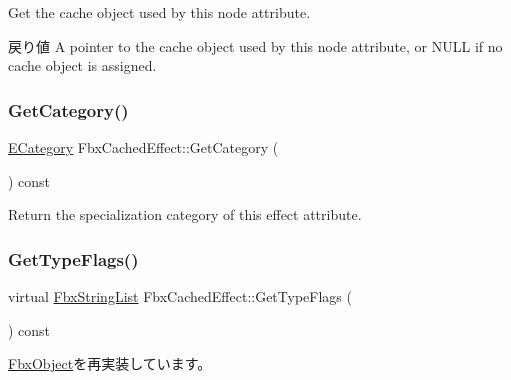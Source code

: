 Get the cache object used by this node attribute. \begin{DoxyReturn}{戻り値}
A pointer to the cache object used by this node attribute, or {\ttfamily N\+U\+LL} if no cache object is assigned. 
\end{DoxyReturn}
\mbox{\label{class_fbx_cached_effect_af5282be789653d1a9c189ddd8540bc5b}} 
\subsubsection{\texorpdfstring{Get\+Category()}{GetCategory()}}
{\footnotesize\ttfamily \hyperlink{class_fbx_cached_effect_ab402402f3e66d6e31eb3002b0bd58c33}{E\+Category} Fbx\+Cached\+Effect\+::\+Get\+Category (\begin{DoxyParamCaption}{ }\end{DoxyParamCaption}) const}



Return the specialization category of this effect attribute. 

\mbox{\label{class_fbx_cached_effect_a0702b43325ac99858e85525b3174e921}} 
\subsubsection{\texorpdfstring{Get\+Type\+Flags()}{GetTypeFlags()}}
{\footnotesize\ttfamily virtual \hyperlink{class_fbx_string_list}{Fbx\+String\+List} Fbx\+Cached\+Effect\+::\+Get\+Type\+Flags (\begin{DoxyParamCaption}{ }\end{DoxyParamCaption}) const\hspace{0.3cm}{\ttfamily [virtual]}}



\hyperlink{class_fbx_object_a6d30a5d00400039a248977cf9f9255b2}{Fbx\+Object}を再実装しています。

\mbox{\label{class_fbx_cached_effect_a895c62dc90594a2df7d9392632b626a6}} 
